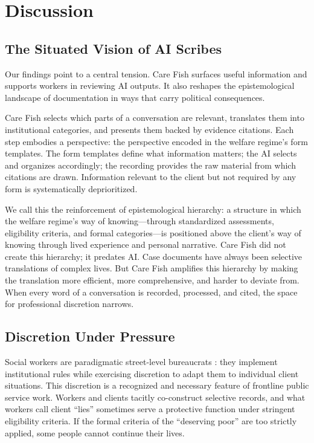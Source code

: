 \documentclass{article}
\begin{document}
\section{Discussion}

\subsection{The Situated Vision of AI Scribes}

Our findings point to a central tension. Care Fish surfaces useful information and supports workers in reviewing AI outputs. It also reshapes the epistemological landscape of documentation in ways that carry political consequences.

Care Fish selects which parts of a conversation are relevant, translates them into institutional categories, and presents them backed by evidence citations. Each step embodies a perspective: the perspective encoded in the welfare regime's form templates. The form templates define what information matters; the AI selects and organizes accordingly; the recording provides the raw material from which citations are drawn. Information relevant to the client but not required by any form is systematically deprioritized.

We call this the reinforcement of epistemological hierarchy: a structure in which the welfare regime's way of knowing---through standardized assessments, eligibility criteria, and formal categories---is positioned above the client's way of knowing through lived experience and personal narrative. Care Fish did not create this hierarchy; it predates AI. Case documents have always been selective translations of complex lives. But Care Fish amplifies this hierarchy by making the translation more efficient, more comprehensive, and harder to deviate from. When every word of a conversation is recorded, processed, and cited, the space for professional discretion narrows.

\subsection{Discretion Under Pressure}

Social workers are paradigmatic street-level bureaucrats \citep{lipsky2010street}: they implement institutional rules while exercising discretion to adapt them to individual client situations. This discretion is a recognized and necessary feature of frontline public service work. Workers and clients tacitly co-construct selective records, and what workers call client ``lies'' sometimes serve a protective function under stringent eligibility criteria. If the formal criteria of the ``deserving poor'' are too strictly applied, some people cannot continue their lives.
\end{document}
